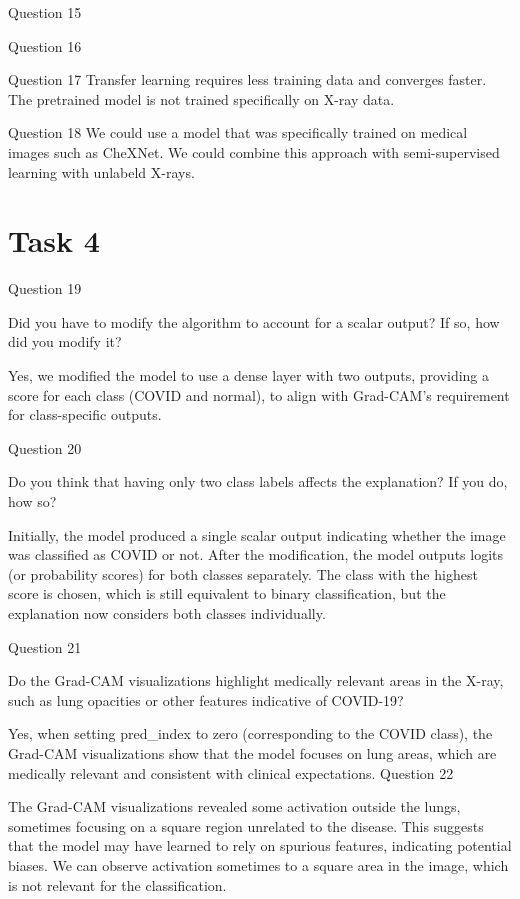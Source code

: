 \documentclass[conference]{IEEEtran}
\begin{document}
Question 15

Question 16

Question 17
Transfer learning requires less training data and converges faster. 
The pretrained model is not trained specifically on X-ray data.

Question 18
We could use a model that was specifically trained on medical images such as CheXNet.
We could combine this approach with semi-supervised learning with unlabeld X-rays.

\section{Task 4}

Question 19

Did you have to modify the algorithm to account for a scalar output? If so, how did you modify it?

Yes, we modified the model to use a dense layer with two outputs, providing a score for each class (COVID and normal), to align with Grad-CAM’s requirement for class-specific outputs.

Question 20

Do you think that having only two class labels affects the explanation? If you do, how so?

Initially, the model produced a single scalar output indicating whether the image was classified as COVID or not.
After the modification, the model outputs logits (or probability scores) for both classes separately. The class with the highest score is chosen, which is still equivalent to binary classification, but the explanation now considers both classes individually.

Question 21

Do the Grad-CAM visualizations highlight medically relevant areas in the X-ray, such as lung opacities or other features indicative of COVID-19?

Yes, when setting pred\_index to zero (corresponding to the COVID class), the Grad-CAM visualizations show that the model focuses on lung areas, which are medically relevant and consistent with clinical expectations.
Question 22

The Grad-CAM visualizations revealed some activation outside the lungs, sometimes focusing on a square region unrelated to the disease. This suggests that the model may have learned to rely on spurious features, indicating potential biases.
We can observe activation sometimes to a square area in the image, which is not relevant for the classification.
\end{document}
